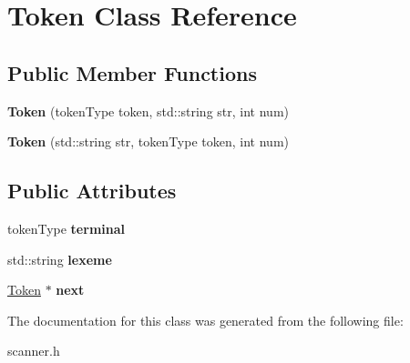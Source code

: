 \hypertarget{classToken}{\section{Token Class Reference}
\label{classToken}
}
\subsection*{Public Member Functions}
\begin{DoxyCompactItemize}
\item 
\hypertarget{classToken_af4c3afd1828939fd920d9c58850971fa}{{\bfseries Token} (token\-Type token, std\-::string str, int num)}\label{classToken_af4c3afd1828939fd920d9c58850971fa}

\item 
\hypertarget{classToken_aa2564a196cd32a37dfd1e59424f2f278}{{\bfseries Token} (std\-::string str, token\-Type token, int num)}\label{classToken_aa2564a196cd32a37dfd1e59424f2f278}

\end{DoxyCompactItemize}
\subsection*{Public Attributes}
\begin{DoxyCompactItemize}
\item 
\hypertarget{classToken_a11b4722b5e4023d234d2017126de378b}{token\-Type {\bfseries terminal}}\label{classToken_a11b4722b5e4023d234d2017126de378b}

\item 
\hypertarget{classToken_abbff29ede445ed4a8520580f12490832}{std\-::string {\bfseries lexeme}}\label{classToken_abbff29ede445ed4a8520580f12490832}

\item 
\hypertarget{classToken_a32f24a25af788c192e5b387dc8d67914}{\hyperlink{classToken}{Token} $\ast$ {\bfseries next}}\label{classToken_a32f24a25af788c192e5b387dc8d67914}

\end{DoxyCompactItemize}


The documentation for this class was generated from the following file\-:\begin{DoxyCompactItemize}
\item 
scanner.\-h\end{DoxyCompactItemize}
